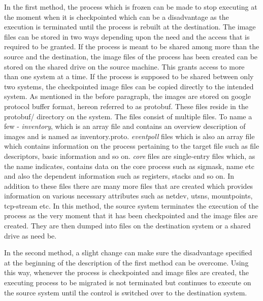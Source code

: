\documentclass[conference]{IEEEtran}
\begin{document}
In the first method, the process which is frozen can be made to stop executing at the moment when it is checkpointed which can be a disadvantage as the execution is terminated until the process is rebuilt at the destination. The image files can be stored in two ways depending upon the need and the access that is required to be granted. If the process is meant to be shared among more than the source and the destination, the image files of the process has been created can be stored on the shared drive on the source machine. This grants access to more than one system at a time. If the process is supposed to be shared between only two systems, the checkpointed image files can be copied directly to the intended system. As mentioned in the before paragraph, the images are stored on google protocol buffer format, hereon referred to as protobuf. These files reside in the protobuf/ directory on the system. The files consist of multiple files. To name  a few - \emph{inventory}, which is an array file and contains an overview description of images and is named as inventory.proto. \emph{eventpoll} files which is also an array file which contains information on the process pertaining to the target file such as file descriptors, basic information and so on. \emph{core} files are single-entry files which, as the name indicates, contains data on the core process such as sigmask, name etc and also the dependent information such as registers, stacks and so on. In addition to these files there are many more files that are created which provides information on various necessary attributes such as netdev, utsns, mountpoints, tcp-stream etc. In this method, the source system terminates the execution of the process as the very moment that it has been checkpointed and the image files are created. They are then dumped into files on the destination system or a shared drive as need be. 

In the second method, a slight change can make sure the disadvantage specified at the beginning of the description of the first method can be overcome. Using this way, whenever the process is checkpointed and image files are created, the executing process to be migrated is not terminated but continues to execute on the source system until the control is switched over to the destination system. 
\end{document}
